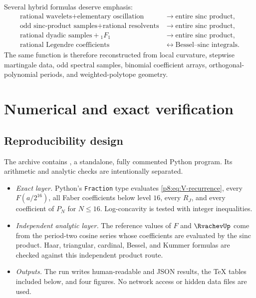 \documentclass[11pt]{article}
\theoremstyle{definition}
\theoremstyle{remark}
\begin{document}
\endgroup

Several hybrid formulas deserve emphasis:
\begin{align}
 \text{rational wavelets}+\text{elementary oscillation}
 &\longrightarrow \text{entire sinc product},            \label{p8:eq:hybrid1}\\
 \text{odd sinc-product samples}+\text{rational resolvents}
 &\longrightarrow \text{entire sinc product},            \label{p8:eq:hybrid2}\\
 \text{rational dyadic samples}+{}_1F_1
 &\longrightarrow \text{entire sinc product},            \label{p8:eq:hybrid3}\\
 \text{rational Legendre coefficients}
 &\longleftrightarrow \text{Bessel--sinc integrals}.       \label{p8:eq:hybrid4}
\end{align}
The same function is therefore reconstructed from local curvature, stepwise
martingale data, odd spectral samples, binomial coefficient arrays,
orthogonal-polynomial periods, and weighted-polytope geometry.

\section{Numerical and exact verification}
\label{p8:sec:numerics}

\subsection{Reproducibility design}

The archive contains
, a standalone, fully commented
Python program.  Its arithmetic and analytic checks are intentionally
separated.

\begin{itemize}
\item \emph{Exact layer.}  Python's \texttt{Fraction} type evaluates
      \eqref{p8:eq:V-recurrence}, every $F(a/2^{16})$, all Faber coefficients
      below level $16$, every $R_J$, and every coefficient of $P_N$ for
      $N\le16$.  Log-concavity is tested with integer inequalities.
\item \emph{Independent analytic layer.}  The reference values of $F$ and
      $\RvachevUp$ come from the period-two cosine series whose coefficients are
      evaluated by the sinc product.  Haar, triangular, cardinal, Bessel, and
      Kummer formulas are checked against this independent product route.
\item \emph{Outputs.}  The run writes human-readable and JSON results, the
      TeX tables included below, and four figures.  No network access or
      hidden data files are used.
\end{itemize}
\end{document}
